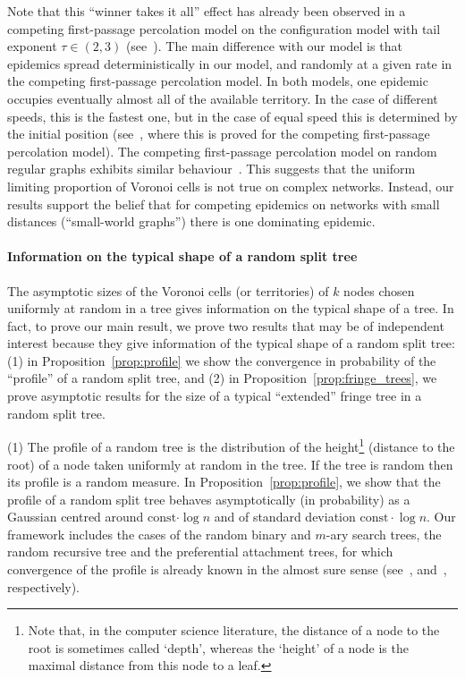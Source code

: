 \documentclass[AHL,Unicode,longabstracts,published]{cedram}
\newcommand{\const}{\mathrm{const}}
\newcommand{\const}{\mathrm{const}}
\begin{document}
Note that this ``winner takes it all'' effect has already been observed in a competing first-passage percolation model on the configuration model with tail exponent $\tau\in(2,3)$ (see~\cite{deijfen2016}). The main difference with our model is that epidemics spread deterministically in our model, and randomly at a given rate in the competing first-passage percolation model. In both models, one epidemic occupies eventually almost all of the available territory. In the case of different speeds, this is the fastest one, but in the case of equal speed this is determined by the initial position (see~\cite{BaronHofstKomja15,HofstKomja15}, where this is proved for the competing first-passage percolation model). The competing first-passage percolation model on random regular graphs exhibits similar behaviour~\cite{Antun17}. This suggests that the uniform limiting proportion of Voronoi cells is not true on complex networks. Instead, our results support the belief that for competing epidemics on networks with small distances (``small-world graphs'') there is one dominating epidemic.


\paragraph*{Information on the typical shape of a random split tree}
The asymptotic sizes of the Voronoi cells (or territories) of $k$ nodes chosen uniformly at random in a tree gives information on the typical shape of a tree. In fact, to prove our main result, we prove two results that may be of independent interest because they give information of the typical shape of a random split tree: (1) in Proposition~\ref{prop:profile} we show the convergence in probability of the ``profile'' of a random split tree, and (2) in Proposition~\ref{prop:fringe_trees}, we prove asymptotic results for the size of a typical ``extended'' fringe tree in a random split tree.

(1) The profile of a random tree is the distribution of the height\footnote{Note that, in the computer science literature, the distance of a node to the root is sometimes called `depth', whereas the `height' of a node is the maximal distance from this node to a leaf.} (distance to the root) of a node taken uniformly at random in the tree. If the tree is random then its profile is a random measure. In Proposition~\ref{prop:profile}, we show that the profile of a random split tree behaves asymptotically (in probability) as a Gaussian centred around $\const{\cdot{\log n}}$ and of standard deviation $\const\cdot{\log n}$. Our framework includes the cases of the random binary and $m$-ary search trees, the random recursive tree and the preferential attachment trees, for which convergence of the profile is already known in the almost sure sense (see~\cite{CDJ01,MM17}, and~\cite{Katona05}, respectively).
\end{document}
